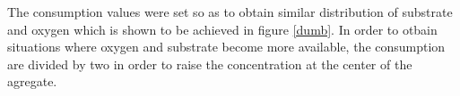 \documentclass[11pt,a4paper]{article}
\begin{document}
The consumption values were set so as to obtain similar distribution of substrate and oxygen which is shown to be achieved in figure \ref{dumb}. In order to otbain situations where oxygen and substrate become more available, the consumption are divided by two in order to raise the concentration at the center of the agregate. 

\newpage


\end{document}

